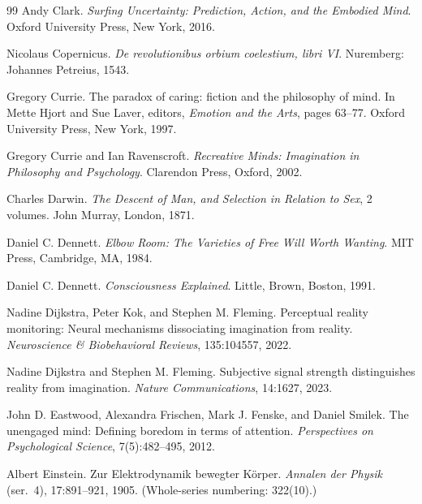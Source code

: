 \documentclass[11pt,a4paper]{article}
\theoremstyle{remark}\newtheorem{remark}[definition]{Remark}
\begin{document}
\begin{thebibliography}{99}
Andy Clark.
\newblock \emph{Surfing Uncertainty: Prediction, Action, and the Embodied Mind}.
\newblock Oxford University Press, New York, 2016.

Nicolaus Copernicus.
\newblock \emph{De revolutionibus orbium coelestium, libri VI}.
\newblock Nuremberg: Johannes Petreius, 1543.

Gregory Currie.
\newblock The paradox of caring: fiction and the philosophy of mind.
\newblock In Mette Hjort and Sue Laver, editors, \emph{Emotion and the Arts}, pages 63--77. Oxford University Press, New York, 1997.

Gregory Currie and Ian Ravenscroft.
\newblock \emph{Recreative Minds: Imagination in Philosophy and Psychology}.
\newblock Clarendon Press, Oxford, 2002.

Charles Darwin.
\newblock \emph{The Descent of Man, and Selection in Relation to Sex}, 2 volumes.
\newblock John Murray, London, 1871.

Daniel C. Dennett.
\newblock \emph{Elbow Room: The Varieties of Free Will Worth Wanting}.
\newblock MIT Press, Cambridge, MA, 1984.

Daniel C. Dennett.
\newblock \emph{Consciousness Explained}.
\newblock Little, Brown, Boston, 1991.

Nadine Dijkstra, Peter Kok, and Stephen M. Fleming.
\newblock Perceptual reality monitoring: Neural mechanisms dissociating imagination from reality.
\newblock \emph{Neuroscience \& Biobehavioral Reviews}, 135:104557, 2022.

Nadine Dijkstra and Stephen M. Fleming.
\newblock Subjective signal strength distinguishes reality from imagination.
\newblock \emph{Nature Communications}, 14:1627, 2023.

John D. Eastwood, Alexandra Frischen, Mark J. Fenske, and Daniel Smilek.
\newblock The unengaged mind: Defining boredom in terms of attention.
\newblock \emph{Perspectives on Psychological Science}, 7(5):482--495, 2012.

Albert Einstein.
\newblock Zur Elektrodynamik bewegter K\"orper.
\newblock \emph{Annalen der Physik} (ser.~4), 17:891--921, 1905. (Whole-series numbering: 322(10).)


\end{thebibliography}
\end{document}
